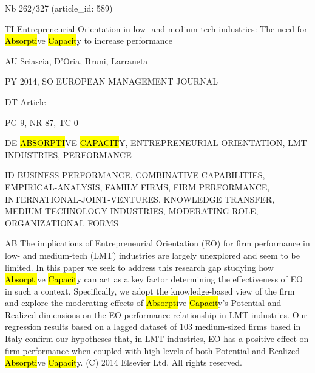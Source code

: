 \documentclass[a4paper]{article}
\begin{document}
\vspace*{-2cm}
Nb \tabto{0cm}262/327 (article\_id: 589)\par
TI \tabto{0cm}Entrepreneurial Orientation in low- and medium-tech industries: The need for \hl{Absorpti}ve \hl{Capacit}y to increase performance\par
AU \tabto{0cm}Sciascia, D'Oria, Bruni, Larraneta\par
PY \tabto{0cm}2014, SO EUROPEAN MANAGEMENT JOURNAL\par
DT \tabto{0cm}Article\par
PG \tabto{0cm}9, NR 87, TC 0\par
DE \tabto{0cm}\hl{ABSORPTI}VE \hl{CAPACIT}Y, ENTREPRENEURIAL ORIENTATION, LMT INDUSTRIES, PERFORMANCE\par
ID \tabto{0cm}BUSINESS PERFORMANCE, COMBINATIVE CAPABILITIES, EMPIRICAL-ANALYSIS, FAMILY FIRMS, FIRM PERFORMANCE, INTERNATIONAL-JOINT-VENTURES, KNOWLEDGE TRANSFER, MEDIUM-TECHNOLOGY INDUSTRIES, MODERATING ROLE, ORGANIZATIONAL FORMS\par
AB \tabto{0cm}The implications of Entrepreneurial Orientation (EO) for firm performance in low- and medium-tech (LMT) industries are largely unexplored and seem to be limited. In this paper we seek to address this research gap studying how \hl{Absorpti}ve \hl{Capacit}y can act as a key factor determining the effectiveness of EO in such a context. Specifically, we adopt the knowledge-based view of the firm and explore the moderating effects of \hl{Absorpti}ve \hl{Capacit}y's Potential and Realized dimensions on the EO-performance relationship in LMT industries. Our regression results based on a lagged dataset of 103 medium-sized firms based in Italy confirm our hypotheses that, in LMT industries, EO has a positive effect on firm performance when coupled with high levels of both Potential and Realized \hl{Absorpti}ve \hl{Capacit}y. (C) 2014 Elsevier Ltd. All rights reserved.\par
\clearpage
\end{document}

